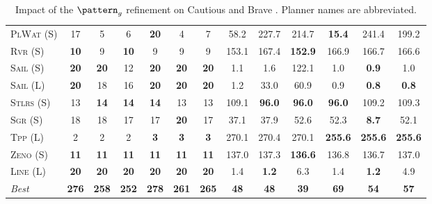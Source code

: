 \documentclass[11pt,landscape]{article}
\begin{document}
\begin{table}[tb]
{\begin{tabular}{|l||cccccc||cccccc||}
\textsc{PlWat} (S)&17&5&6&\textbf{20}&4&7&58.2&227.7&214.7&\textbf{15.4}&241.4&199.2\\
\textsc{Rvr} (S)&\textbf{10}&9&\textbf{10}&9&9&9&153.1&167.4&\textbf{152.9}&166.9&166.7&166.6\\
\textsc{Sail} (S)&\textbf{20}&\textbf{20}&12&\textbf{20}&\textbf{20}&\textbf{20}&1.1&1.6&122.1&1.0&\textbf{0.9}&1.0\\
\textsc{Sail} (L)&\textbf{20}&18&16&\textbf{20}&\textbf{20}&\textbf{20}&1.2&33.0&60.9&0.9&\textbf{0.8}&\textbf{0.8}\\
\textsc{Stlrs} (S)&13&\textbf{14}&\textbf{14}&\textbf{14}&13&13&109.1&\textbf{96.0}&\textbf{96.0}&\textbf{96.0}&109.2&109.3\\
\textsc{Sgr} (S)&18&18&17&17&\textbf{20}&17&37.1&37.9&52.6&52.3&\textbf{8.7}&52.1\\
\textsc{Tpp} (L)&2&2&2&\textbf{3}&\textbf{3}&\textbf{3}&270.1&270.4&270.1&\textbf{255.6}&\textbf{255.6}&\textbf{255.6}\\
\textsc{Zeno} (S)&\textbf{11}&\textbf{11}&\textbf{11}&\textbf{11}&\textbf{11}&\textbf{11}&137.0&137.3&\textbf{136.6}&136.8&136.7&137.0\\
\textsc{Line} (L)&\textbf{20}&\textbf{20}&\textbf{20}&\textbf{20}&\textbf{20}&\textbf{20}&1.4&\textbf{1.2}&6.3&1.4&\textbf{1.2}&4.9
\\\hline
\textit{Best}&\textbf{276}&\textbf{258}&\textbf{252}&\textbf{278}&\textbf{261}&\textbf{265}&\textbf{48}&\textbf{48}&\textbf{39}&\textbf{69}&\textbf{54}&\textbf{57}\\\hline

        \end{tabular}}
        \caption{Impact of the $\pattern_g$ refinement on Cautious and Brave \pattyd. Planner names are abbreviated.}
        \label{tab:abl-patterng}
        \end{table}
        
\end{document}
